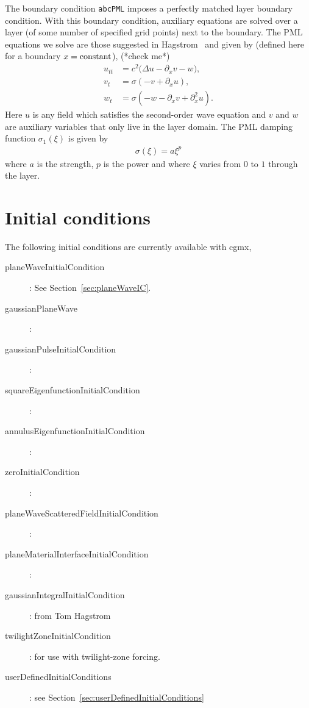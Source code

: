 \documentclass{article}
\begin{document}
The boundary condition {\tt abcPML} imposes a perfectly matched layer boundary condition.
With this boundary condition, auxiliary equations are solved over a layer (of some number of
specified grid points) next to the boundary. The PML equations we solve
are those suggested in Hagstrom~\cite{Hagstrom1999} and given by (defined here for a boundary $x={\rm constant}$), (*check me*)
\begin{align}
  u_{tt} &= c^2 \Big( \Delta u - \partial_x v - w \Big), \\
   v_t &= \sigma( -v + \partial_x u ) , \\
   w_t &= \sigma ( -w  - \partial_x v + \partial_x^2 u ). 
\end{align}
Here $u$ is any field which satisfies the second-order wave equation and $v$ and $w$ are auxiliary variables
that only live in the layer domain. 
The PML damping function $\sigma_1(\xi)$ is given by 
\begin{align}
  \sigma(\xi) = a \xi^p
\end{align}
where $a$ is the strength, $p$ is the power and where $\xi$ varies from $0$ to $1$ through the layer.






\clearpage
\section{Initial conditions} \label{sec:ic}

\noindent The following initial conditions are currently available with cgmx,
\begin{description}
  \item[planeWaveInitialCondition]: See Section~\ref{sec:planeWaveIC}. 
  \item[gaussianPlaneWave]:
  \item[gaussianPulseInitialCondition]:
  \item[squareEigenfunctionInitialCondition]:  
  \item[annulusEigenfunctionInitialCondition]:
  \item[zeroInitialCondition]:
  \item[planeWaveScatteredFieldInitialCondition]:
  \item[planeMaterialInterfaceInitialCondition]:
  \item[gaussianIntegralInitialCondition]:   from Tom Hagstrom
  \item[twilightZoneInitialCondition]: for use with twilight-zone forcing. 
  \item[userDefinedInitialConditions] : see Section~\ref{sec:userDefinedInitialConditions}
\end{description}
\end{document}
